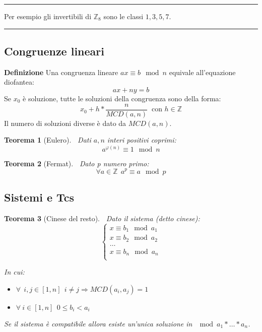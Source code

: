 \documentclass{article}
\newtheorem{theorem}{Teorema}
\begin{document}
\noindent\rule{\textwidth}{0.5pt}

Per esempio gli invertibili di $\mathbb{Z}_8$ sono le classi $1,3,5,7$.

\noindent\rule{\textwidth}{0.5pt}\newline

\newpage

\subsection{Congruenze lineari}

\textbf{Definizione} Una congruenza lineare $ax\equiv b\mod{n}$ equivale all'equazione diofantea:
$$ax+ny=b$$
\noindent Se $x_0$ è soluzione, tutte le soluzioni della congruenza sono della forma:
$$x_0+h*\frac{n}{MCD(a,n)}\ \text{ con } h\in\mathbb{Z}$$
\noindent Il numero di soluzioni diverse è dato da $MCD(a,n)$.\newline

\begin{theorem}[Eulero]$\ $\newline
    Dati $a,n$ interi positivi coprimi:
        $$a^{\varphi(n)}\equiv1\mod{n}$$
\end{theorem}

\begin{theorem}[Fermat]$\ $\newline
    Dato p numero primo:
    $$\forall a\in\mathbb{Z}\ \ a^p\equiv a\mod{p}$$
\end{theorem}

\subsection{Sistemi e Tcs}

\begin{theorem}[Cinese del resto]$\ $\newline
    Dato il sistema (detto cinese):
    \[
    \begin{cases}
        x\equiv b_1\mod{a_1}\\
        x\equiv b_2\mod{a_2}\\
        \ldots\\
        x\equiv b_n\mod{a_n}\\
    \end{cases}
    \]

\noindent In cui: 
\begin{itemize}
    \item $\forall\ \ i,j\in[1,n] \ \ i\neq j\Rightarrow MCD(a_i,a_j)=1$
    \item $\forall\ i\in[1,n]\ \ 0\leq b_i<a_i$\newline
\end{itemize}

\noindent Se il sistema è compatibile allora esiste un'unica soluzione in $\mod{a_1*\ldots*a_n}$.\newline
    
\end{theorem}
\end{document}
